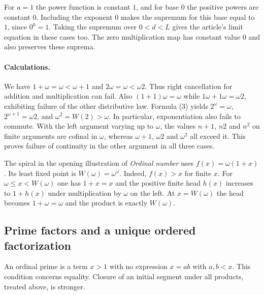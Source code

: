For $a=1$ the power function is constant $1$, and for base $0$ the
positive powers are constant $0$. Including the exponent $0$ makes the
supremum for this base equal to $1$, since $0^0=1$. Taking the supremum over
$0<d<L$ gives the article's limit equation in these cases too. The zero
multiplication map has constant value $0$ and also preserves these suprema.

\paragraph{Calculations.}
We have $1+\omega=\omega<\omega+1$ and
$2\omega=\omega<\omega 2$. Thus right cancellation for addition and
multiplication can fail. Also $(1+1)\omega=\omega$ while
$1\omega+1\omega=\omega 2$, exhibiting failure of the other distributive
law. Formula (3) yields $2^\omega=\omega$, $2^{\omega+1}=\omega 2$,
and $\omega^2=W(2)>\omega$. In particular, exponentiation also
fails to commute. With the left argument varying up to $\omega$, the
values $n+1$, $n2$ and $n^2$ on finite arguments are cofinal in
$\omega$, whereas $\omega+1$, $\omega 2$ and $\omega^2$ all exceed it.
This proves failure of continuity in the other argument in all three cases.

The spiral in the opening illustration of \emph{Ordinal number} uses
$f(x)=\omega(1+x)$. Its least fixed point is $W(\omega)=\omega^\omega$.
Indeed, $f(x)>x$ for finite $x$. For $\omega\le x<W(\omega)$ one has
$1+x=x$ and the positive finite head $h(x)$ increases to $1+h(x)$
under multiplication by $\omega$ on the left. At $x=W(\omega)$ the
head becomes $1+\omega=\omega$ and the product is exactly $W(\omega)$.

\subsection{Prime factors and a unique ordered factorization}
An ordinal prime is a term $x>1$ with no expression $x=ab$ with $a,b<x$.
This condition concerns equality. Closure of an initial segment under
all products, treated above, is stronger.

